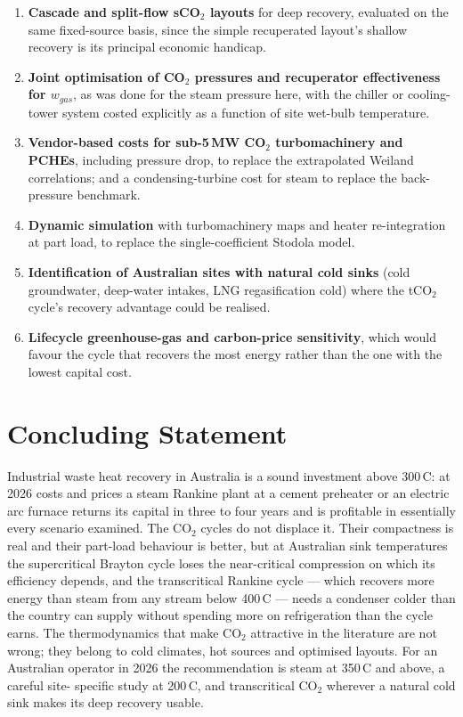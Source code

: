 \begin{enumerate}[leftmargin=1.8em,itemsep=4pt]
\item \textbf{Cascade and split-flow sCO$_2$ layouts} for deep recovery,
evaluated on the same fixed-source basis, since the simple recuperated
layout's shallow recovery is its principal economic handicap.
\item \textbf{Joint optimisation of CO$_2$ pressures and recuperator
effectiveness for $w_{gas}$}, as was done for the steam pressure here,
with the chiller or cooling-tower system costed explicitly as a function of
site wet-bulb temperature.
\item \textbf{Vendor-based costs for sub-5\,MW CO$_2$ turbomachinery and
PCHEs}, including pressure drop, to replace the extrapolated Weiland
correlations; and a condensing-turbine cost for steam to replace the
back-pressure benchmark.
\item \textbf{Dynamic simulation} with turbomachinery maps and heater
re-integration at part load, to replace the single-coefficient Stodola model.
\item \textbf{Identification of Australian sites with natural cold sinks}
(cold groundwater, deep-water intakes, LNG regasification cold) where the
tCO$_2$ cycle's recovery advantage could be realised.
\item \textbf{Lifecycle greenhouse-gas and carbon-price sensitivity}, which
would favour the cycle that recovers the most energy rather than the one
with the lowest capital cost.
\end{enumerate}

\section{Concluding Statement}
\label{sec:concluding}

Industrial waste heat recovery in Australia is a sound investment above
300\,\textdegree C: at 2026 costs and prices a steam Rankine plant at a
cement preheater or an electric arc furnace returns its capital in three to
four years and is profitable in essentially every scenario examined. The
CO$_2$ cycles do not displace it. Their compactness is real and their
part-load behaviour is better, but at Australian sink temperatures the
supercritical Brayton cycle loses the near-critical compression on which its
efficiency depends, and the transcritical Rankine cycle --- which recovers
more energy than steam from any stream below 400\,\textdegree C --- needs a
condenser colder than the country can supply without spending more on
refrigeration than the cycle earns. The thermodynamics that make CO$_2$
attractive in the literature are not wrong; they belong to cold climates,
hot sources and optimised layouts. For an Australian operator in 2026 the
recommendation is steam at 350\,\textdegree C and above, a careful site-
specific study at 200\,\textdegree C, and transcritical CO$_2$ wherever a
natural cold sink makes its deep recovery usable.
